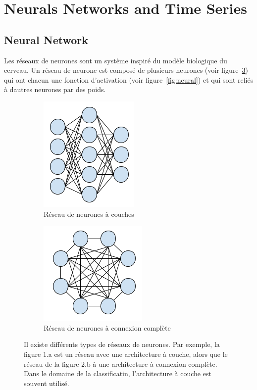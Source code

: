\documentclass[11pt]{sdm}
\begin{document}
\section{Neurals Networks and Time Series}
	\subsection{Neural Network}
		Les r\'eseaux de neurones sont un syst\`eme inspir\'e du mod\`ele biologique du cerveau. Un r\'eseau de neurone est compos\'e de plusieurs neurones (voir figure~\ref{fig:neuralNetwork}) qui ont chacun une fonction d’activation (voir figure~\ref{fig:neural}) et qui sont reli\'es \`a d\textquotesingle autres neurones par des poids.

		\bigbreak

		\begin{figure}[!ht]
			\centering
			\begin{subfigure}{0.45\textwidth}
				\centering	
				\includegraphics[scale=0.7,natwidth=183,natheight=213]{figures/neuralNetworkLayers.png}
				\caption{R\'eseau de neurones \`a couches}
				\label{fig:nnl}
			\end{subfigure}
			\hspace*{\fill}
			\begin{subfigure}{0.45\textwidth}	
				\centering
				\includegraphics[scale=0.7,natwidth=198,natheight=192]{figures/neuralNetworkCompleteConnexion.png}
				\caption{R\'eseau de neurones \`a connexion compl\`ete}
				\label{fig:nnc}
			\end{subfigure}
			\caption{Il existe diff\'erents types de r\'eseaux de neurones. Par exemple, la figure 1.a est un r\'eseau avec une architecture \`a couche, alors que le r\'eseau de la figure 2.b \`a une architecture \`a connexion compl\`ete. Dans le domaine de la classificatin, l'architecture \`a couche est souvent utilis\'e.}
			\label{fig:neuralNetwork}
		\end{figure}
\end{document}
